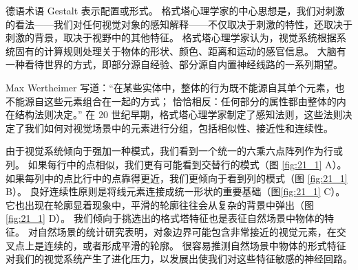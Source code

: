 德语术语 Gestalt 表示配置或形式。 
格式塔心理学家的中心思想是，我们对刺激的看法——我们对任何视觉对象的感知解释——不仅取决于刺激的特性，还取决于刺激的背景，取决于视野中的其他特征。 
格式塔心理学家认为，视觉系统根据系统固有的计算规则处理关于物体的形状、颜色、距离和运动的感官信息。 
大脑有一种看待世界的方式，即部分源自经验、部分源自内置神经线路的一系列期望。


Max Wertheimer 写道：“在某些实体中，整体的行为既不能源自其单个元素，也不能源自这些元素组合在一起的方式； 恰恰相反：任何部分的属性都由整体的内在结构法则决定。” 
在 20 世纪早期，格式塔心理学家制定了感知法则，这些法则决定了我们如何对视觉场景中的元素进行分组，包括相似性、接近性和连续性。


由于视觉系统倾向于强加一种模式，我们看到一个统一的六乘六点阵列作为行或列。 
如果每行中的点相似，我们更有可能看到交替行的模式（图 \ref{fig:21_1} A）。 
如果每列中的点比行中的点靠得更近，我们更倾向于看到列的模式（图 \ref{fig:21_1} B）。 
良好连续性原则是将线元素连接成统一形状的重要基础（图\ref{fig:21_1} C）。 
它也出现在轮廓显着现象中，平滑的轮廓往往会从复杂的背景中弹出（图 \ref{fig:21_1} D）。
我们倾向于挑选出的格式塔特征也是表征自然场景中物体的特征。 
对自然场景的统计研究表明，对象边界可能包含非常接近的视觉元素，在交叉点上是连续的，或者形成平滑的轮廓。
很容易推测自然场景中物体的形式特征对我们的视觉系统产生了进化压力，以发展出使我们对这些特征敏感的神经回路。


